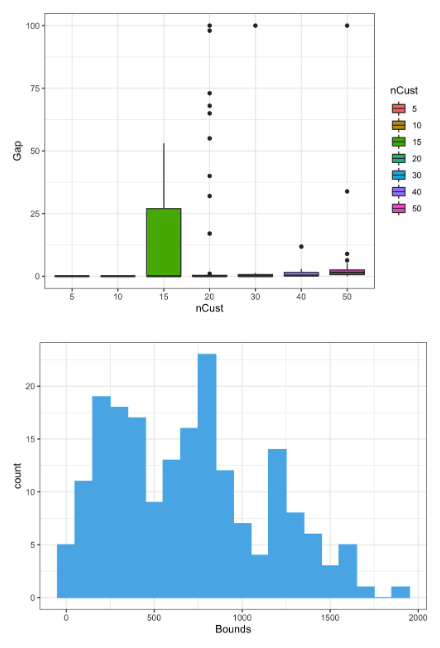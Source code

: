 \documentclass[5p,times]{elsarticle}
\begin{document}
			\begin{figure}
				\begin{center}
					\includegraphics[scale=0.11]{fig/boxplot}
					\label{fig:boxplot}
				\end{center}
			\end{figure}

			\begin{figure}
				\begin{center}
					\includegraphics[scale=0.11]{fig/histogram}
					\label{fig:histogram}
				\end{center}
			\end{figure}
	
\end{document}
